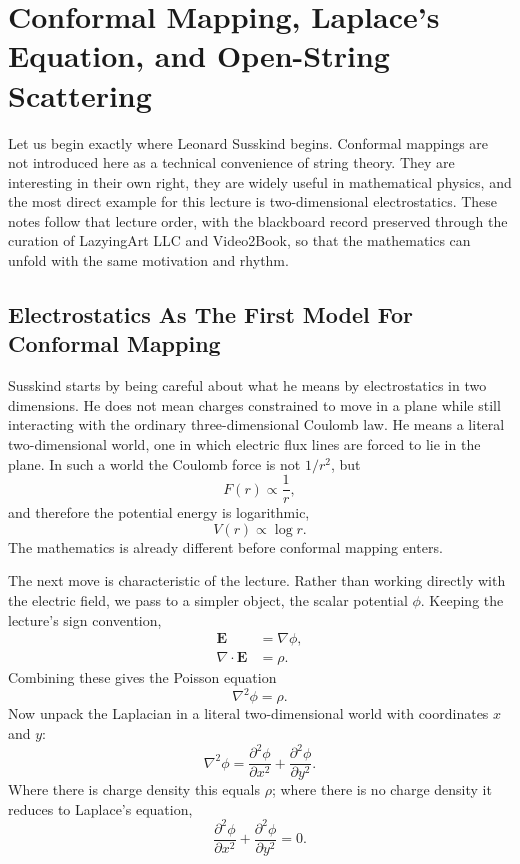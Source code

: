 \chapter{Conformal Mapping, Laplace's Equation, and Open-String Scattering}

Let us begin exactly where Leonard Susskind begins. Conformal mappings are not introduced here as a technical convenience of string theory. They are interesting in their own right, they are widely useful in mathematical physics, and the most direct example for this lecture is two-dimensional electrostatics. These notes follow that lecture order, with the blackboard record preserved through the curation of LazyingArt LLC and Video2Book, so that the mathematics can unfold with the same motivation and rhythm.

\section{Electrostatics As The First Model For Conformal Mapping}

Susskind starts by being careful about what he means by electrostatics in two dimensions. He does not mean charges constrained to move in a plane while still interacting with the ordinary three-dimensional Coulomb law. He means a literal two-dimensional world, one in which electric flux lines are forced to lie in the plane. In such a world the Coulomb force is not \(1/r^2\), but
\begin{equation}
F(r)\propto \frac{1}{r},
\end{equation}
and therefore the potential energy is logarithmic,
\begin{equation}
V(r)\propto \log r.
\end{equation}
The mathematics is already different before conformal mapping enters.

The next move is characteristic of the lecture. Rather than working directly with the electric field, we pass to a simpler object, the scalar potential \(\phi\). Keeping the lecture's sign convention,
\begin{align}
\mathbf E &= \nabla \phi, \\
\nabla\cdot \mathbf E &= \rho.
\end{align}
Combining these gives the Poisson equation
\begin{equation}
\nabla^2\phi=\rho.
\end{equation}
Now unpack the Laplacian in a literal two-dimensional world with coordinates \(x\) and \(y\):
\begin{equation}
\nabla^2\phi
=
\frac{\partial^2\phi}{\partial x^2}
+
\frac{\partial^2\phi}{\partial y^2}.
\end{equation}
Where there is charge density this equals \(\rho\); where there is no charge density it reduces to Laplace's equation,
\begin{equation}
\frac{\partial^2\phi}{\partial x^2}
+
\frac{\partial^2\phi}{\partial y^2}
=0.
\end{equation}


